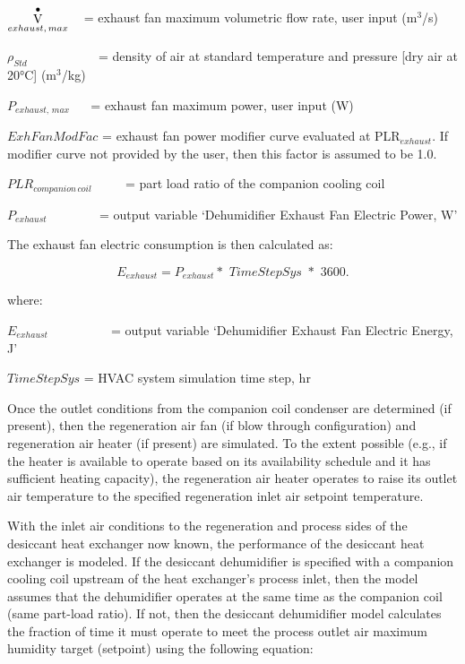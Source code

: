 \({\mathop {\rm{V}}\limits^ \bullet_{exhaust,\,max}}\) ~ = exhaust fan maximum volumetric flow rate, user input (m\(^{3}\)/s)

\({\rho_{Std}}\) ~~~~~~~~~~ = density of air at standard temperature and pressure {[}dry air at 20°C{]} (m\(^{3}\)/kg)

\({P_{exhaust,\,max}}\) ~~ = exhaust fan maximum power, user input (W)

\(ExhFanModFac\) = exhaust fan power modifier curve evaluated at PLR\(_{exhaust}\). If modifier curve not provided by the user, then this factor is assumed to be 1.0.

\(PL{R_{companion\,coil}}\) ~~~~ = part load ratio of the companion cooling coil

\({P_{exhaust}}\) ~~~~~~~ = output variable `Dehumidifier Exhaust Fan Electric Power, W'

The exhaust fan electric consumption is then calculated as:

\begin{equation}
{E_{exhaust}} = {P_{exhaust}}*\,\,TimeStepSys\,\,*\,\,3600.
\end{equation}

where:

\({E_{exhaust}}\) ~~~~~~ ~~ = output variable `Dehumidifier Exhaust Fan Electric Energy, J'

\(TimeStepSys\) = HVAC system simulation time step, hr

Once the outlet conditions from the companion coil condenser are determined (if present), then the regeneration air fan (if blow through configuration) and regeneration air heater (if present) are simulated. To the extent possible (e.g., if the heater is available to operate based on its availability schedule and it has sufficient heating capacity), the regeneration air heater operates to raise its outlet air temperature to the specified regeneration inlet air setpoint temperature.

With the inlet air conditions to the regeneration and process sides of the desiccant heat exchanger now known, the performance of the desiccant heat exchanger is modeled. If the desiccant dehumidifier is specified with a companion cooling coil upstream of the heat exchanger's process inlet, then the model assumes that the dehumidifier operates at the same time as the companion coil (same part-load ratio). If not, then the desiccant dehumidifier model calculates the fraction of time it must operate to meet the process outlet air maximum humidity target (setpoint) using the following equation:

